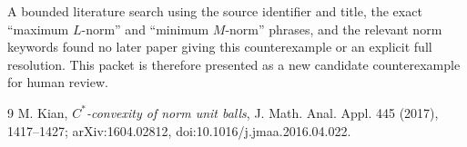 \documentclass[11pt]{article}
\begin{document}
A bounded literature search using the source identifier and title, the exact
``maximum $L$-norm'' and ``minimum $M$-norm'' phrases, and the relevant norm
keywords found no later paper giving this counterexample or an explicit full
resolution.  This packet is therefore presented as a new candidate
counterexample for human review.

\begingroup\raggedright
\begin{thebibliography}{9}
M. Kian,
\emph{$C^*$-convexity of norm unit balls},
J. Math. Anal. Appl. 445 (2017), 1417--1427;
arXiv:1604.02812, doi:10.1016/j.jmaa.2016.04.022.
\end{thebibliography}
\endgroup
\end{document}
